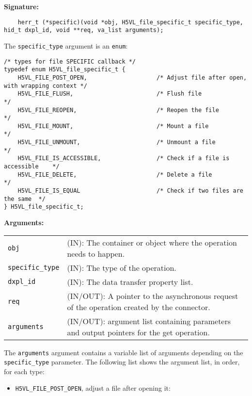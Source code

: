 \begin{mdframed}[style=bgbox] 
\textbf{Signature:}
\begin{lstlisting}
    herr_t (*specific)(void *obj, H5VL_file_specific_t specific_type, hid_t dxpl_id, void **req, va_list arguments);
\end{lstlisting}

The \texttt{specific\_type} argument is an \texttt{enum}:
\begin{lstlisting}
/* types for file SPECIFIC callback */
typedef enum H5VL_file_specific_t {                                              
    H5VL_FILE_POST_OPEN,                    /* Adjust file after open, with wrapping context */
    H5VL_FILE_FLUSH,                        /* Flush file                       */
    H5VL_FILE_REOPEN,                       /* Reopen the file                  */
    H5VL_FILE_MOUNT,                        /* Mount a file                     */
    H5VL_FILE_UNMOUNT,                      /* Unmount a file                   */
    H5VL_FILE_IS_ACCESSIBLE,                /* Check if a file is accessible    */
    H5VL_FILE_DELETE,                       /* Delete a file                    */
    H5VL_FILE_IS_EQUAL                      /* Check if two files are the same  */
} H5VL_file_specific_t;
\end{lstlisting}

\textbf{Arguments:}\\
\begin{tabular}{l p{13.5cm}}
  \texttt{obj} & (IN): The container or object where the operation needs
  to happen.\\
  \texttt{specific\_type} & (IN): The type of the operation.\\
  \texttt{dxpl\_id} & (IN): The data transfer property list.\\
  \texttt{req} & (IN/OUT): A pointer to the asynchronous request of the
  operation created by the connector.\\
  \texttt{arguments} & (IN/OUT): argument list containing parameters and
  output pointers for the get operation. \\
\end{tabular}

The \texttt{arguments} argument contains a variable list of arguments
depending on the \texttt{specific\_type} parameter. The following list shows
the argument list, in order, for each type:

\begin{itemize}
\item \texttt{H5VL\_FILE\_POST\_OPEN}, adjust a file after opening it:
        

\end{itemize}
\end{mdframed}
